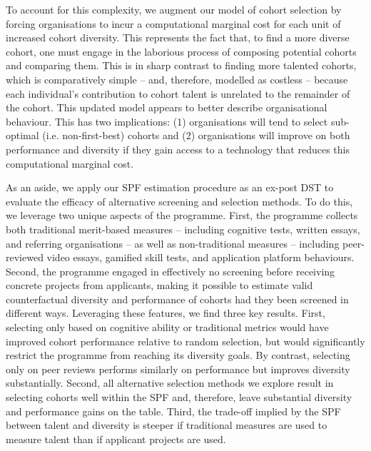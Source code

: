 To account for this complexity, we augment our model of cohort selection by forcing organisations to incur a computational marginal cost for each unit of increased cohort diversity. This represents the fact that, to find a more diverse cohort, one must engage in the laborious process of composing potential cohorts and comparing them. This is in sharp contrast to finding more talented cohorts, which is comparatively simple -- and, therefore, modelled as costless -- because each individual's contribution to cohort talent is unrelated to the remainder of the cohort. This updated model appears to better describe organisational behaviour. This has two implications: (1) organisations will tend to select sub-optimal (i.e. non-first-best) cohorts and (2) organisations will improve on both performance and diversity if they gain access to a technology that reduces this computational marginal cost. 

As an aside, we apply our SPF estimation procedure as an ex-post DST to evaluate the efficacy of alternative screening and selection methods. To do this, we leverage two unique aspects of the programme. First, the programme collects both traditional merit-based measures -- including cognitive tests, written essays, and referring organisations -- as well as non-traditional measures -- including peer-reviewed video essays, gamified skill tests, and application platform behaviours. Second, the programme engaged in effectively no screening before receiving concrete projects from applicants, making it possible to estimate valid counterfactual diversity and performance of cohorts had they been screened in different ways. Leveraging these features, we find three key results. First, selecting only based on cognitive ability or traditional metrics would have improved cohort performance relative to random selection, but would significantly restrict the programme from reaching its diversity goals. By contrast, selecting only on peer reviews performs similarly on performance but improves diversity substantially. Second, all alternative selection methods we explore result in selecting cohorts well within the SPF and, therefore, leave substantial diversity and performance gains on the table. Third, the trade-off implied by the SPF between talent and diversity is steeper if traditional measures are used to measure talent than if applicant projects are used. 

